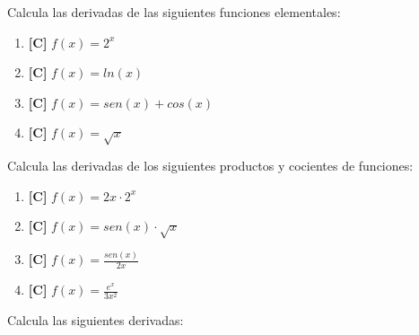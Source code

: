 \Exercicio Calcula las derivadas de las siguientes funciones elementales:

\begin{enumerate}[topsep=0pt]
	\item \textbf{[C]} $ f(x) = 2^x $
	\item \textbf{[C]} $ f(x) = ln(x) $
	\item \textbf{[C]} $ f(x) = sen(x) + cos(x)$
	\item \textbf{[C]} $ f(x) = \sqrt{x}$
\end{enumerate}


\Exercicio Calcula las derivadas de los siguientes productos y cocientes de funciones:

\begin{enumerate}[topsep=0pt]
	\item \textbf{[C]} $ f(x) = 2x \cdot 2^x $
	\item \textbf{[C]} $ f(x) = sen(x) \cdot \sqrt{x} $
	\item \textbf{[C]} $ f(x) = \frac{sen(x)}{2x} $
	\item \textbf{[C]} $ f(x) = \frac{e^x}{3x^2}$
\end{enumerate}


\Exercicio Calcula las siguientes derivadas:

